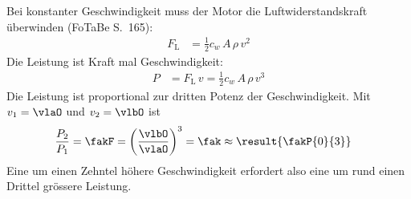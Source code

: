 Bei konstanter Geschwindigkeit muss der Motor die Luftwiderstandskraft überwinden (FoTaBe S.~165):
\begin{align}
 F_\mathrm{L} &= \frac{1}{2}c_w\,A\,\rho\,v^2
\end{align}
Die Leistung ist Kraft mal Geschwindigkeit:
\begin{align}
 P &= F_\mathrm{L}\,v = \frac{1}{2}c_w\,A\,\rho\,v^3
\end{align}
Die Leistung ist proportional zur dritten Potenz der Geschwindigkeit. Mit $v_1 = \vlaO$ und $v_2 = \vlbO$ ist
\begin{align}
 \frac{P_2}{P_1} &= \fakF = \left(\frac{\vlbO}{\vlaO}\right)^3 = \fak \approx \result{\fakP{0}{3}}
\end{align}
Eine um einen Zehntel höhere Geschwindigkeit erfordert also eine um rund einen Drittel grössere Leistung.
